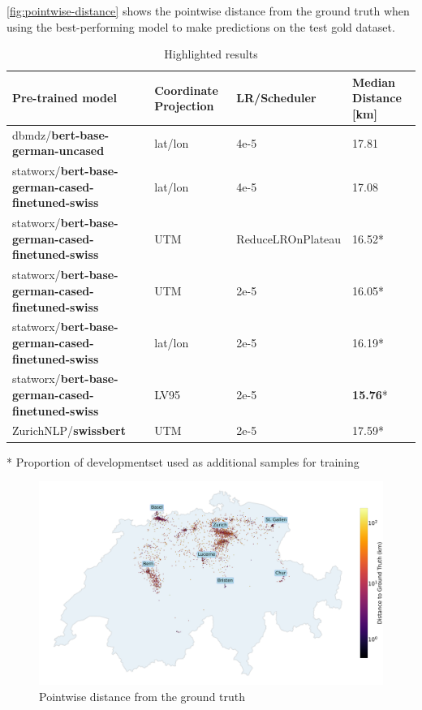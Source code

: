 \autoref{fig:pointwise-distance} shows the pointwise distance from the ground truth when using the best-performing model to make predictions on the test gold dataset.

\begin{table}
    \centering
    \begin{tabular}{p{}|p{}|p{}|p{}}
        \toprule
        Pre-trained model                                        & Coordinate Projection & LR/Scheduler      & Median Distance [km] \\
        \midrule
        dbmdz/\textbf{bert-base-german-uncased}                  & lat/lon               & 4e-5              & 17.81                \\
        statworx/\textbf{bert-base-german-cased-finetuned-swiss} & lat/lon               & 4e-5              & 17.08                \\
        statworx/\textbf{bert-base-german-cased-finetuned-swiss} & UTM                   & ReduceLROnPlateau & 16.52*               \\
        statworx/\textbf{bert-base-german-cased-finetuned-swiss} & UTM                   & 2e-5              & 16.05*               \\
        statworx/\textbf{bert-base-german-cased-finetuned-swiss} & lat/lon               & 2e-5              & 16.19*               \\
        statworx/\textbf{bert-base-german-cased-finetuned-swiss} & LV95                  & 2e-5              & \textbf{15.76}*      \\
        ZurichNLP/\textbf{swissbert}                             & UTM                   & 2e-5              & 17.59*               \\
        \bottomrule
    \end{tabular}
    \caption{Highlighted results}
    \bigskip
    \raggedright
    * Proportion of developmentset used as additional samples for training \\
    \label{tbl:highlighted-results}
\end{table}

\begin{figure}
    \centering
    \includegraphics[width=\textwidth]{./figs/dotmap.png}
    \caption{Pointwise distance from the ground truth}
    \label{fig:pointwise-distance}
\end{figure}

